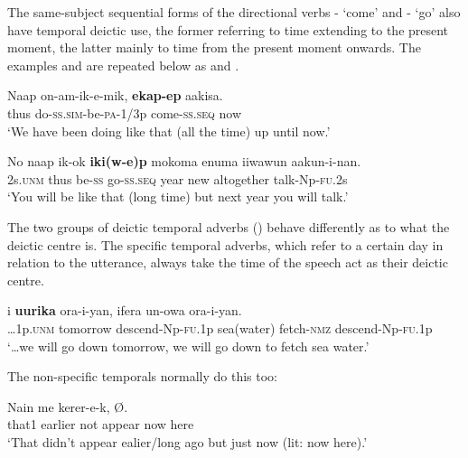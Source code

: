 The same-subject sequential forms of the directional verbs - `come' and - `go' also have temporal deictic use, the former referring to time extending to the present moment, the latter mainly to time from the present moment onwards. The examples  and  
are repeated below as  and .

\ea%
\label{ex:x1941}
\gll Naap  on-am-ik-e-mik,  \textbf{ekap-ep} aakisa. \\
thus  do-\textsc{ss}.\textsc{sim}-be-\textsc{pa}-1/3p  come-\textsc{ss}.\textsc{seq}  now\\
\glt `We have been doing like that (all the time) up until now.'
\z

\ea%
\label{ex:x1942}
\gll No  naap  ik-ok  \textbf{iki(w-e)p}  mokoma  enuma  iiwawun aakun-i-nan.\\
2s.\textsc{unm}  thus  be-\textsc{ss}  go-\textsc{ss}.\textsc{seq}  year  new  altogether talk-Np-\textsc{fu}.2s\\
\glt `You will be like that (long time) but next year you will talk.'
\z

The two groups of deictic temporal adverbs () behave differently as to what the deictic centre is. The specific temporal adverbs, which refer to a certain day in relation to the utterance, always take the time of the speech act as their deictic centre. 

\ea%
\label{ex:x1889}
\gll {\dots}i  \textbf{uurika}  ora-i-yan,  ifera  un-owa ora-i-yan.\\
{\dots}1p.\textsc{unm}  tomorrow  descend-Np-\textsc{fu}.1p  sea(water)  fetch-\textsc{nmz} descend-Np-\textsc{fu}.1p\\
\glt `{\dots}we will go down tomorrow, we will go down to fetch sea water.'
\z

The non-specific temporals normally do this too: 

\ea%
\label{ex:x1890}
\gll Nain    me  kerer-e-k,     {\O}. \\
that1  earlier  not  appear  now  here \\
\glt `That didn't appear ealier/long ago but just now (lit: now here).'
\z

